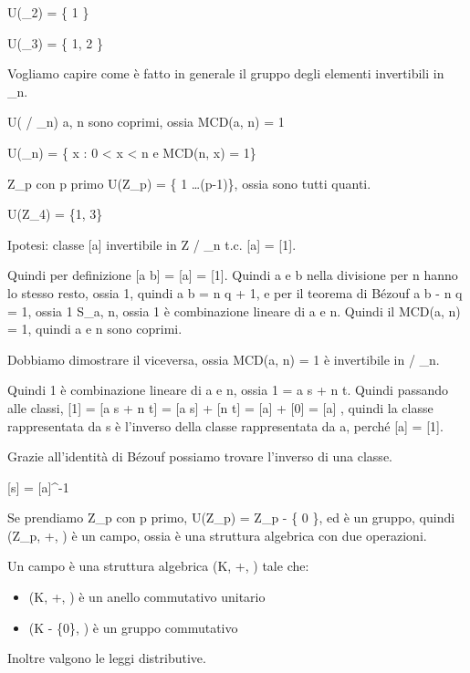 U(_2) = \{ 1 \}

U(_3) = \{ 1,  2 \}

Vogliamo capire come \`e fatto in generale il gruppo degli elementi invertibili in _n.

\begin{prop}
[a] \in U( / \equiv_n) \Leftrightarrow a, n sono coprimi, ossia MCD(a, n) = 1
\end{prop}

\begin{cor}
U(_n) = \{ x \in {} : 0 < x < n e MCD(n, x) = 1\}
\end{cor}

Z_p con p primo U(Z_p) = \{ 1 \dots (p-1)\}, ossia sono tutti quanti.

U(Z_4) = \{1, 3\}

Ipotesi: classe [a] invertibile in Z / \equiv_n \Rightarrow \exists [b] t.c. [a] \cdot [b] = [1]. 

Quindi per definizione [a \cdot b] = [a] \cdot [b] = [1]. Quindi a e b nella divisione per n hanno lo stesso resto, ossia 1, quindi a \cdot b = n \cdot q + 1, e per il teorema di B\'ezouf a \cdot b - n \cdot q = 1, ossia 1 \in S_{a, n}, ossia 1 \`e combinazione lineare di a e n. Quindi il MCD(a, n) = 1, quindi a e n sono coprimi.

Dobbiamo dimostrare il viceversa, ossia MCD(a, n) = 1 \Rightarrow [a] \`e invertibile in  / \equiv_n.

Quindi 1 \`e combinazione lineare di a e n, ossia 1 = a \cdot s + n \cdot t. Quindi passando alle classi, [1] = [a \cdot s + n \cdot t] = [a \cdot s] + [n \cdot t] = [a] \cdot [s] + [0] = [a] \cdot [s], quindi la classe rappresentata da s \`e l'inverso della classe rappresentata da a, perch\'e [a] \cdot [s] = [1].

Grazie all'identit\`a di B\'ezouf possiamo trovare l'inverso di una classe.

[s] = [a]^{-1}

Se prendiamo Z_p con p primo, U(Z_p) = Z_p - \{ 0 \}, ed \`e un gruppo, quindi (Z_p, +, \cdot) \`e un campo, ossia \`e una struttura algebrica con due operazioni.

Un campo \`e una struttura algebrica (K, +, \cdot) tale che:
\begin{itemize}
    \item (K, +, \cdot) \`e un anello commutativo unitario
    \item (K - \{0\}, \cdot) \`e un gruppo commutativo
\end{itemize}
Inoltre valgono le leggi distributive.

